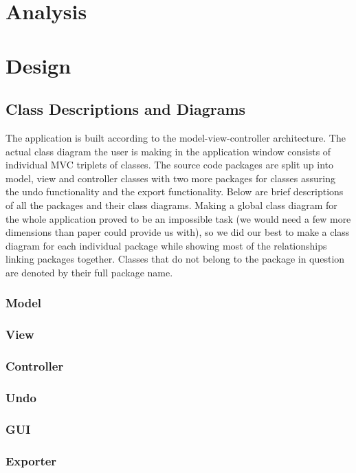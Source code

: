 \documentclass[a4paper]{article}
\newcommand{\tab}{\hspace*{1.5em}}
\begin{document}

\newpage
\tableofcontents 
\newpage

\section{Analysis}
	
\section{Design}
	\subsection{Class Descriptions and Diagrams}
		\tab The application is built according to the model-view-controller architecture. The actual class diagram the user is making in the application window consists of individual MVC triplets of classes. The source code packages are split up into model, view and controller classes with two more packages for classes assuring the undo functionality and the export functionality. Below are brief descriptions of all
the packages and their class diagrams. Making a global class diagram for the whole application proved to be an impossible task (we would need a few more dimensions than paper could provide us with), so we did our best to make a class diagram for each individual package while showing most of the relationships linking packages together. Classes that do not belong to the package in question are denoted by their full package name.
		\subsubsection{Model}
			
		\subsubsection{View}
			
		\subsubsection{Controller}
			
		\subsubsection{Undo}
				
		\subsubsection{GUI}
			
		\subsubsection{Exporter}
			
\end{document}
